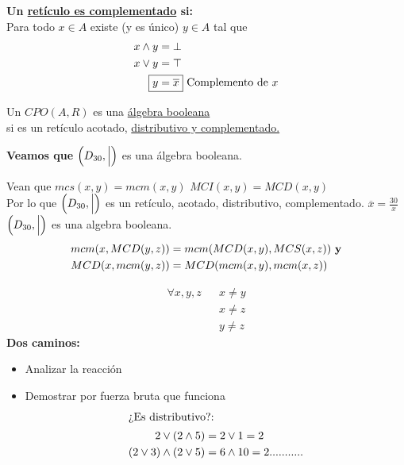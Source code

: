\documentclass[12pt, twoside]{article}
\begin{document}
\textbf{Un \underline{retículo es complementado} si:}\\
Para todo $x\in A$ existe (y es único) $y\in A$ tal que
\begin{align*}
	x\wedge y &= \bot\\
	x\vee y &= \top\\
	\Aboxed{y &= \overline{x}} \text{ Complemento de $x$}
\end{align*}

Un $CPO(A,R)$ es una \underline{álgebra booleana}\\
si es un retículo acotado, \underline{distributivo y complementado.}

\textbf{Veamos que } $\Big{(}D_{30},\Big{|}\Big{)}$ es una álgebra booleana.
\begin{figure}[H]
	\centering
	
\end{figure}

Vean que $mcs(x,y)=mcm(x,y)$ $MCI(x,y)=MCD(x,y)$\\
Por lo que $\Big{(}D_{30},\Big{|}\Big{)}$
es un retículo, acotado, distributivo, complementado.
$\overline{x} = \frac{30}{x}$ $\Big{(}D_{30},\Big{|}\Big{)}$ es una
algebra booleana.
\begin{align*}
	mcm(x,MCD(y,z)) &= mcm(MCD(x,y),MCS(x,z)) \text{ \textbf{y}}\\
	MCD(x,mcm(y,z)) &= MCD(mcm(x,y),mcm(x,z))
\end{align*}

\begin{align*}
	\forall x,y,z && x \neq y\\
	&& x \neq z\\
	&& y \neq z
\end{align*}
\textbf{Dos caminos:}
\begin{itemize}
	\item Analizar la reacción
	\item Demostrar por fuerza bruta que funciona
		\begin{align*}
			\intertext{¿Es distributivo?:}
			2 \vee (2\wedge 5 ) &= 2 \vee 1 = 2\\
			(2\vee 3) \wedge(2\vee 5) &= 6 \wedge 10 = 2...........
		\end{align*}
\end{itemize}
\end{document}

